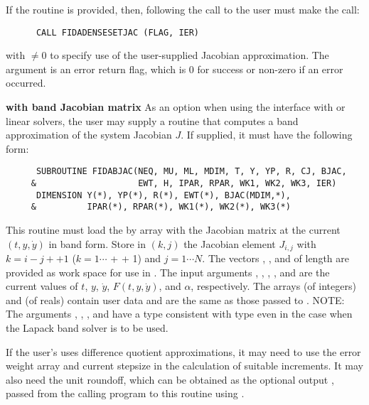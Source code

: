 \begin{Steps}
  If the  routine is provided, then, following the call to  
  the user must make the call:
\begin{verbatim}
      CALL FIDADENSESETJAC (FLAG, IER)
\end{verbatim}
  with  $\neq 0$ to specify use of the user-supplied Jacobian
  approximation.  The argument  is an error return flag, which is $0$ 
  for success or non-zero if an error occurred.


  {\bf {\idadls} with band Jacobian matrix}
   As an option when using the {\idadls} interface with
  {\sunlinsolband} or {\sunlinsollapband} linear solvers, the user may
  supply a routine that computes a band approximation of the system
  Jacobian  $J$. If supplied, it must have the following form:  
\begin{verbatim}
      SUBROUTINE FIDABJAC(NEQ, MU, ML, MDIM, T, Y, YP, R, CJ, BJAC,
     &                    EWT, H, IPAR, RPAR, WK1, WK2, WK3, IER)
      DIMENSION Y(*), YP(*), R(*), EWT(*), BJAC(MDIM,*), 
     &          IPAR(*), RPAR(*), WK1(*), WK2(*), WK3(*)
\end{verbatim}
  This routine must load the  by  array  with the
  Jacobian matrix at the current $(t, y, \dot{y})$ in band form.  Store in
  $(k,j)$ the Jacobian element $J_{i,j}$ with $k = i - j + $$ + 1$
  ($k = 1 \cdots $ +  + 1) and $j = 1 \cdots N$. The vectors
  , , and  of length  are provided as work space
  for use in .
  The input arguments , , , , and  are the
  current values of $t$, $y$, $\dot{y}$, $F(t,y,\dot{y})$, and $\alpha$, respectively.
  The arrays  (of integers) and  (of reals) contain user data
  and are the same as those passed to .
  NOTE: The arguments , , , and  have a type
  consistent with {\CC} type  even in the case when the Lapack band
  solver is to be used.

  If the user's  uses difference quotient approximations, it
  may need to use the error weight array  and current stepsize 
  in the calculation of suitable increments.  It may also need the unit
  roundoff, which can be obtained as the optional output ,
  passed from the calling program to this routine using .


\end{Steps}
